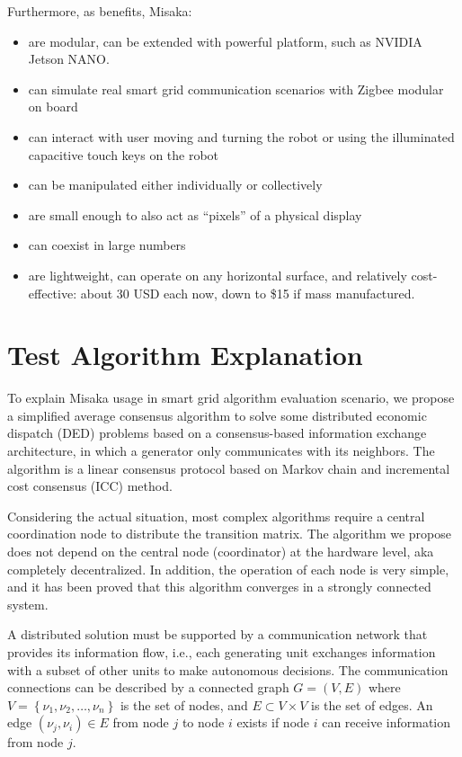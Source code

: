 \documentclass[conference]{IEEEtran}
\begin{document}
Furthermore, as benefits, Misaka:

\begin{itemize}
    \item are modular, can be extended with powerful platform, such as NVIDIA Jetson NANO.
    \item can simulate real smart grid communication scenarios with Zigbee modular on board
    \item can interact with user moving and turning the robot or using the illuminated capacitive touch keys on the robot 
    \item can be manipulated either individually or collectively
    \item are small enough to also act as “pixels” of a physical display
    \item can coexist in large numbers
    \item are lightweight, can operate on any horizontal surface, and relatively cost-effective: about 30 USD each now, down to \$15 if mass manufactured.
\end{itemize}

\section{Test Algorithm Explanation}
\label{sec:Algorithm}

To explain Misaka usage in smart grid algorithm evaluation scenario, we propose a simplified average consensus algorithm to solve some distributed economic dispatch (DED) problems based on a consensus-based information exchange architecture, in which a generator only communicates with its neighbors. The algorithm is a linear consensus protocol based on Markov chain and incremental cost consensus (ICC) method.

Considering the actual situation, most complex algorithms require a central coordination node to distribute the transition matrix. The algorithm we propose does not depend on the central node (coordinator) at the hardware level, aka completely decentralized. In addition, the operation of each node is very simple, and it has been proved that this algorithm converges in a strongly connected system.

A distributed solution must be supported by a communication network that provides its information flow, i.e., each generating unit exchanges information with a subset of other units to make autonomous decisions\cite{binetti2013distributed}. The communication connections can be described by a connected graph $G=(V, E)$ where $V=\left\{\nu_{1}, \nu_{2}, \ldots, \nu_{n}\right\}$ is the set of nodes, and $E \subset V \times V$
is the set of edges. An edge $\left(\nu_{j}, \nu_{i}\right) \in E$ from node $j$ to node $i$ exists if node $i$ can receive information from node $j$.
\end{document}
